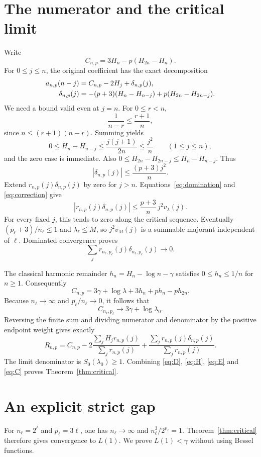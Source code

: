 \documentclass[11pt]{article}
\begin{document}
\section{The numerator and the critical limit}
Write
\[
C_{n,p}=3H_n-p(H_{2n}-H_n).
\]
For $0\le j\le n$, the original coefficient has the exact decomposition
\begin{align}
a_{n,p}(n-j)&=C_{n,p}-2H_j+\delta_{n,p}(j),\label{eq:decomp}\\
\delta_{n,p}(j)&=-(p+3)(H_n-H_{n-j})
+p(H_{2n}-H_{2n-j}).\notag
\end{align}
We need a bound valid even at $j=n$. For $0\le r<n$,
\[
\frac1{n-r}\le\frac{r+1}{n},
\]
since $n\le(r+1)(n-r)$. Summing yields
\[
0\le H_n-H_{n-j}\le\frac{j(j+1)}{2n}\le\frac{j^2}{n}
\qquad(1\le j\le n),
\]
and the zero case is immediate. Also
$0\le H_{2n}-H_{2n-j}\le H_n-H_{n-j}$. Thus
\begin{equation}
|\delta_{n,p}(j)|\le\frac{(p+3)j^2}{n}.
\label{eq:correction}
\end{equation}
Extend $r_{n,p}(j)\delta_{n,p}(j)$ by zero for $j>n$. Equations~\eqref{eq:domination} and \eqref{eq:correction} give
\[
|r_{n,p}(j)\delta_{n,p}(j)|
\le\frac{p+3}{n}\,j^2v_\lambda(j).
\]
For every fixed $j$, this tends to zero along the critical sequence. Eventually $(p_\ell+3)/n_\ell\le1$ and $\lambda_\ell\le M$, so $j^2v_M(j)$ is a summable majorant independent of $\ell$. Dominated convergence proves
\begin{equation}
\sum_j r_{n_\ell,p_\ell}(j)\delta_{n_\ell,p_\ell}(j)\longrightarrow0.
\label{eq:E}
\end{equation}

The classical harmonic remainder $h_n=H_n-\log n-\gamma$ satisfies $0\le h_n\le1/n$ for $n\ge1$. Consequently
\[
C_{n,p}=3\gamma+\log\lambda+3h_n+p h_n-p h_{2n}.
\]
Because $n_\ell\to\infty$ and $p_\ell/n_\ell\to0$, it follows that
\begin{equation}
C_{n_\ell,p_\ell}\longrightarrow3\gamma+\log\lambda_0.
\label{eq:C}
\end{equation}
Reversing the finite sum and dividing numerator and denominator by the positive endpoint weight gives exactly
\[
R_{n,p}=C_{n,p}
-2\frac{\sum_jH_jr_{n,p}(j)}{\sum_jr_{n,p}(j)}
+\frac{\sum_jr_{n,p}(j)\delta_{n,p}(j)}{\sum_jr_{n,p}(j)}.
\]
The limit denominator is $S_0(\lambda_0)\ge1$. Combining \eqref{eq:D}, \eqref{eq:H}, \eqref{eq:E} and \eqref{eq:C} proves Theorem~\ref{thm:critical}.

\section{An explicit strict gap}
For $n_\ell=2^\ell$ and $p_\ell=3\ell$, one has $n_\ell\to\infty$ and $n_\ell^3/2^{p_\ell}=1$. Theorem~\ref{thm:critical} therefore gives convergence to $L(1)$. We prove $L(1)<\gamma$ without using Bessel functions.
\end{document}
